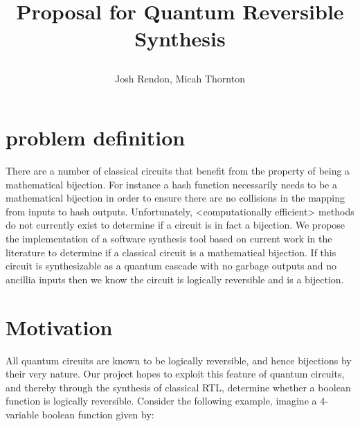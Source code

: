 \documentclass{IEEEtran}
\title {\author{ Josh Rendon, Micah Thornton} Proposal for Quantum Reversible Synthesis}
\begin{document}
\maketitle{}
\begin{abstract}
\end{abstract}
\section{problem definition}
There are a number of classical circuits that benefit from the property of being a mathematical bijection. 
For instance a hash function necessarily needs to be a mathematical bijection in order to ensure there are no collisions in the mapping from inputs to hash outputs. 
Unfortunately, <computationally efficient> methods do not currently exist to determine if a circuit is in fact a bijection.
We propose the implementation of a software synthesis tool based on current work in the literature to determine if a classical circuit is a mathematical bijection.
If this circuit is synthesizable as a quantum cascade with no garbage outputs and no ancillia inputs then we know the circuit is logically reversible and is a bijection.
\section{Motivation}
All quantum circuits are known to be logically reversible, and hence bijections by their very nature. 
Our project hopes to exploit this feature of quantum circuits, and thereby through the synthesis of classical RTL, determine whether a boolean function is logically reversible. 
Consider the following example, imagine a 4-variable boolean function given by: 
\end{document}
